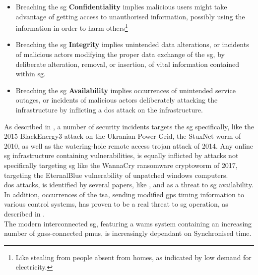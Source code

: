 \begin{itemize}
    \item Breaching the \acrshort{sg} \textbf{Confidentiality} implies malicious users might take advantage of getting access to unauthorised information, possibly using the information in order to harm  others\footnote{Like stealing from people absent from homes, as indicated by low demand for electricity.}
    \item Breaching the \acrshort{sg} \textbf{Integrity} implies unintended data alterations, or incidents of malicious actors modifying the proper data exchange of the \acrshort{sg}, by deliberate alteration, removal, or insertion, of vital information contained within \acrfull{sg}. 

 \item Breaching the \acrshort{sg} \textbf{Availability} implies occurrences of unintended service outages, or incidents of malicious actors deliberately attacking the infrastructure by inflicting a \acrfull{dos} attack on the infrastructure.
\end{itemize}





As described in \cite{sundararajan2019survey}, a number of security incidents targets the \acrshort{sg} specifically, like the 2015 BlackEnergy3 attack on the Ukranian  Power Grid, the StuxNet worm of 2010, as well as the watering-hole remote access trojan attack of 2014. 
Any online \acrshort{sg} infrastructure containing vulnerabilities, is equally inflicted by attacks not specifically targeting \acrfull{sg} like the WannaCry ransomware cryptoworm of 2017, targeting the EternalBlue vulnerability of unpatched windows computers.\\ 


\acrfull{dos} attacks, is identified by several papers, like  \cite{sundararajan2019survey}, \cite{Asri_Pranggono_2015} and \cite{gupta2017survey} as  a threat to \acrshort{sg} availability. \\ 

In addition, occurrences of the \acrfull{tsa}, sending modified \acrshort{gps} timing information to various control systems, has proven to be a real threat to \acrshort{sg} operation, as described  in \cite{ZhangTimeSync2013}. \\ 


The modern interconnected \acrshort{sg}, featuring a \acrshort{wams} system containing an increasing number of \acrshort{gnss}-connected \acrshort{pmu}s, is increasingly dependant on Synchronised time.

